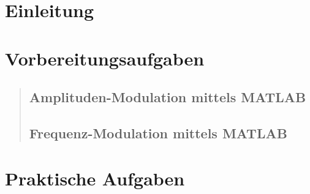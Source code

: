 \section{Einleitung}
\begin{quote}

\end{quote}


\section{Vorbereitungsaufgaben}

    \begin{quote}
    
	    \subsection{Amplituden-Modulation mittels MATLAB}
		\begin{quote}
		
		\end{quote}
		
		\subsection{Frequenz-Modulation mittels MATLAB}
		\begin{quote}
		
		\end{quote}
		
	\end{quote}
         	


\section{Praktische Aufgaben}
\begin{quote}
   
\end{quote}	




